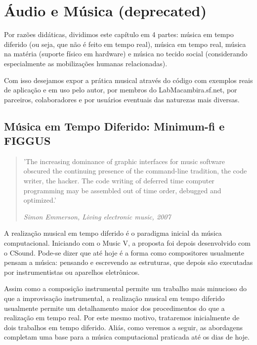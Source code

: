 \clearpage


\section{Áudio e Música (deprecated)}

Por razões didáticas, dividimos este capítulo em 4 partes: música em tempo diferido (ou seja, que não é feito em tempo real),
música em tempo real,  música na matéria (suporte físico em hardware) e música no tecido social
(considerando especialmente as mobilizações humanas relacionadas).

Com isso desejamos expor a prática musical através do código
com exemplos reais de aplicação e em uso pelo autor, por membros do LabMacambira.sf.net,
por parceiros, colaboradores e por usuários eventuais das naturezas mais diversas.

  \subsection{Música em Tempo Diferido: Minimum-fi e FIGGUS}

\begin{quotation}
\small
'The increasing dominance of graphic interfaces for music software obscured 
the continuing presence of the command-line tradition, 
the code writer, the hacker. The code writing of deferred time 
computer programming may be assembled out of time order, debugged and optimized.'

\emph{Simon Emmerson, Living electronic music, 2007}
\end{quotation}

A realização musical em tempo diferido é o paradigma inicial da música computacional.
Iniciando com o Music V, a proposta foi depois desenvolvido com o CSound. Pode-se dizer
que até hoje é a forma como compositores usualmente pensam a música: pensando
e escrevendo as estruturas, que depois são executadas por instrumentistas ou aparelhos eletrônicos.

Assim como a composição instrumental permite um trabalho mais minucioso do que
a improvisação instrumental, a realização musical em tempo diferido usualmente permite um
detalhamento maior dos procedimentos do que a realização em tempo real. Por este
mesmo motivo, trataremos inicialmente de dois trabalhos em tempo diferido.
Aliás, como veremos a seguir, as abordagens completam uma base para a música
computacional praticada até os dias de hoje.

